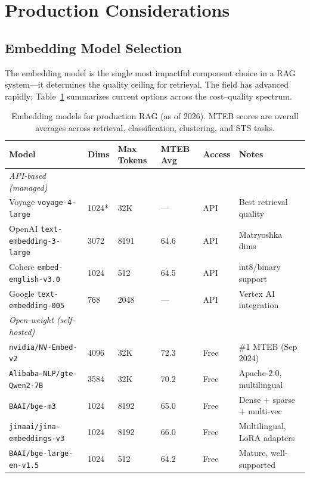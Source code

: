 \section{Production Considerations}
\label{production-considerations}

\subsection{Embedding Model Selection}
\label{embedding-model-selection}

The embedding model is the single most impactful component choice in a RAG system---it determines the quality ceiling for retrieval. The field has advanced rapidly; Table~\ref{tab:embedding_models} summarizes current options across the cost--quality spectrum.

\begin{table}[ht!]
\centering
\caption{Embedding models for production RAG (as of 2026). MTEB scores are overall averages across retrieval, classification, clustering, and STS tasks.}
\label{tab:embedding_models}
{\footnotesize
\begin{tabular}{@{}llllll@{}}
\toprule
\textbf{Model} & \textbf{Dims} & \textbf{Max Tokens} & \textbf{MTEB Avg} & \textbf{Access} & \textbf{Notes} \\
\midrule
\emph{API-based (managed)} &  &  &  &  &  \\
Voyage \texttt{voyage-4-large} & 1024* & 32K & --- & API & Best retrieval quality \\
OpenAI \texttt{text-embedding-3-large} & 3072 & 8191 & 64.6 & API & Matryoshka dims \\
Cohere \texttt{embed-english-v3.0} & 1024 & 512 & 64.5 & API & int8/binary support \\
Google \texttt{text-embedding-005} & 768 & 2048 & --- & API & Vertex AI integration \\
\emph{Open-weight (self-hosted)} &  &  &  &  &  \\
\texttt{nvidia/NV-Embed-v2}~\cite{lee2024nvembed} & 4096 & 32K & 72.3 & Free & \#1 MTEB (Sep 2024) \\
\texttt{Alibaba-NLP/gte-Qwen2-7B}~\cite{li2023gte} & 3584 & 32K & 70.2 & Free & Apache-2.0, multilingual \\
\texttt{BAAI/bge-m3}~\cite{chen2024bgem3} & 1024 & 8192 & 65.0 & Free & Dense + sparse + multi-vec \\
\texttt{jinaai/jina-embeddings-v3} & 1024 & 8192 & 66.0 & Free & Multilingual, LoRA adapters \\
\texttt{BAAI/bge-large-en-v1.5}~\cite{xiao2023cpack} & 1024 & 512 & 64.2 & Free & Mature, well-supported \\
\bottomrule
\end{tabular}
}
\end{table}



